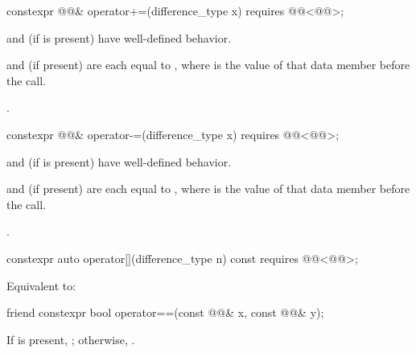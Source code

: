 \begin{itemdecl}
constexpr @@& operator+=(difference_type x)
  requires @@<@@>;
\end{itemdecl}

\begin{itemdescr}
\pnum
\expects
{} and  (if  is present)
have well-defined behavior.

\pnum
\ensures
{} and  (if present) are
each equal to ,
where  is the value of that data member before the call.

\pnum
\returns
{}.
\end{itemdescr}

\begin{itemdecl}
constexpr @@& operator-=(difference_type x)
  requires @@<@@>;
\end{itemdecl}

\begin{itemdescr}
\pnum
\expects
{} and  (if  is present)
have well-defined behavior.

\pnum
\ensures
{} and  (if present) are
each equal to ,
where  is the value of that data member before the call.

\pnum
\returns
{}.
\end{itemdescr}

\begin{itemdecl}
constexpr auto operator[](difference_type n) const
  requires @@<@@>;
\end{itemdecl}

\begin{itemdescr}
\pnum
\effects
Equivalent to: 
\end{itemdescr}

\begin{itemdecl}
friend constexpr bool operator==(const @@& x, const @@& y);
\end{itemdecl}

\begin{itemdescr}
\pnum
\returns
If  is present,
;
otherwise, .
\end{itemdescr}

